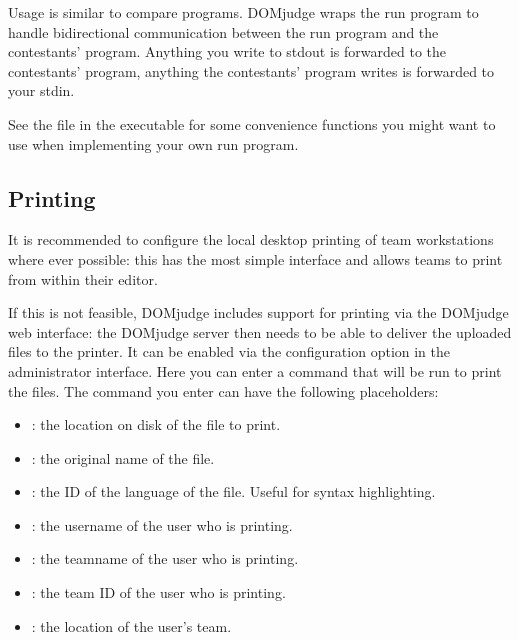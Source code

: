 \documentclass[a4paper,10pt,english,openany]{sphinxmanual}
\begin{document}
\sphinxAtStartPar
Usage is similar to compare programs. DOMjudge wraps the run program to handle
bi\sphinxhyphen{}directional communication between the run program and the contestants’
program. Anything you write to stdout is forwarded to the contestants’ program,
anything the contestants’ program writes is forwarded to your stdin.

\sphinxAtStartPar
See the  file in the  executable for some
convenience functions you might want to use when implementing your own run
program.


\subsection{Printing}
\label{\detokenize{config-advanced:printing}}\label{\detokenize{config-advanced:id1}}
\sphinxAtStartPar
It is recommended to configure the local desktop printing of team
workstations where ever possible: this has the most simple interface
and allows teams to print from within their editor.

\sphinxAtStartPar
If this is not feasible, DOMjudge includes support for printing via
the DOMjudge web interface: the DOMjudge server then needs to be
able to deliver the uploaded files to the printer. It can be
enabled via the  configuration option in
the administrator interface. Here you can enter a command that will
be run to print the files. The command you enter can have the
following placeholders:
\begin{itemize}
\item {} 
\sphinxAtStartPar
\sphinxcode{\sphinxupquote{{[}file{]}}}: the location on disk of the file to print.

\item {} 
\sphinxAtStartPar
\sphinxcode{\sphinxupquote{{[}original{]}}}: the original name of the file.

\item {} 
\sphinxAtStartPar
\sphinxcode{\sphinxupquote{{[}language{]}}}: the ID of the language of the file. Useful for syntax highlighting.

\item {} 
\sphinxAtStartPar
\sphinxcode{\sphinxupquote{{[}username{]}}}: the username of the user who is printing.

\item {} 
\sphinxAtStartPar
\sphinxcode{\sphinxupquote{{[}teamname{]}}}: the teamname of the user who is printing.

\item {} 
\sphinxAtStartPar
\sphinxcode{\sphinxupquote{{[}teamid{]}}}: the team ID of the user who is printing.

\item {} 
\sphinxAtStartPar
\sphinxcode{\sphinxupquote{{[}location{]}}}: the location of the user’s team.

\end{itemize}
\end{document}
